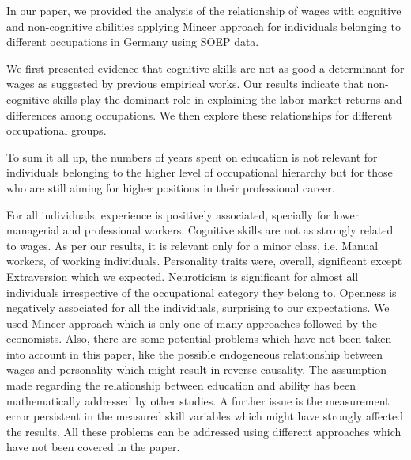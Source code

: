 \documentclass[11pt, a4paper, leqno]{article}
\begin{document}
In our paper, we provided the analysis of the relationship of wages with cognitive and non-cognitive abilities applying Mincer approach for individuals belonging to different occupations in Germany using SOEP data. \par
We first presented evidence that cognitive skills are not as good a determinant for wages as suggested by previous empirical works. Our results indicate that non-cognitive skills play the dominant role in explaining the labor market returns and differences among occupations.
We then explore these relationships for different occupational groups.\par
To sum it all up, the numbers of years spent on education is not relevant for individuals belonging to the higher level of occupational hierarchy but for those who are still aiming for higher positions in their professional career.\par
For all individuals, experience is positively associated, specially for lower managerial and professional workers.
Cognitive skills are not as strongly related to wages. As per our results, it is relevant only for a minor class, i.e. Manual workers, of working individuals.
Personality traits were, overall, significant except Extraversion which we expected. Neuroticism is significant for almost all individuals irrespective of the occupational category they belong to. Openness is negatively associated for all the individuals, surprising to our expectations. 
We used Mincer approach which is only one of many approaches followed by the economists. Also, there are some potential problems which have not been taken into account in this paper, like the possible endogeneous relationship between wages and personality which might result in reverse causality. The assumption made regarding the relationship between education and ability has been mathematically addressed by other studies. A further issue is the measurement error persistent in the measured skill variables which might have strongly affected the results. All these problems can be addressed using different approaches which have not been covered in the paper. 

\printbibliography
{}





\end{document}
